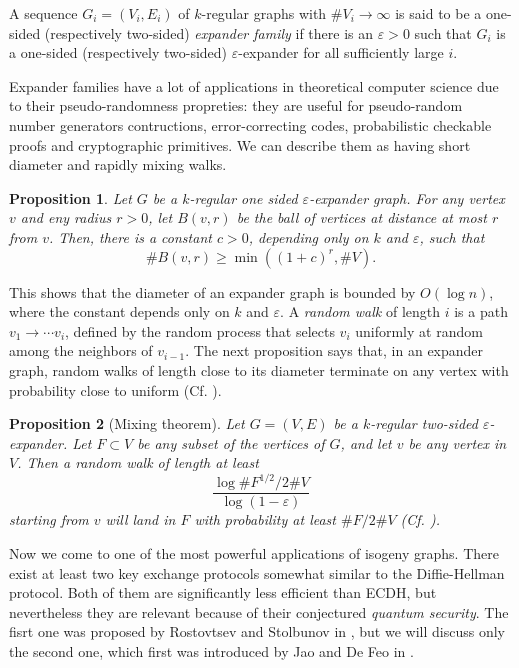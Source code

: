 \documentclass{article}
\theoremstyle{theorem}
\newtheorem{proposition}{Proposition}
\theoremstyle{definition}
\begin{document}
A sequence $G_i = (V_i, E_i)$ of $k$-regular graphs with $\#V_i \to \infty$ is said to be a one-sided (respectively two-sided) \textit{expander family} if there is an $\varepsilon > 0$ such that $G_i$ is a one-sided (respectively two-sided) $\varepsilon$-expander for all sufficiently large $i$.

Expander families have a lot of applications in theoretical computer science due to their pseudo-randomness propreties: they are useful for pseudo-random number generators contructions, error-correcting codes, probabilistic checkable proofs and cryptographic primitives. We can describe them as having short diameter and rapidly mixing walks.

\begin{proposition}
	Let $G$ be a $k$-regular one sided $\varepsilon$-expander graph. For any vertex $v$ and eny radius $r > 0$, let $B(v, r)$ be the ball of vertices at distance at most $r$ from $v$. Then, there is a constant $c > 0$, depending  only on $k$ and $\varepsilon$, such that
		\[ \#B(v, r) \geq\min((1 + c)^r, \#V). \]
\end{proposition}

This shows that the diameter of an expander graph is bounded by $O(\log n)$, where the constant depends only on $k$ and $\varepsilon$. A \textit{random walk} of length $i$ is a path $v_1 \to \cdots v_i$, defined by the random process that selects $v_i$ uniformly at random among the neighbors of $v_{i-1}$. The next proposition says that, in an expander graph, random walks of length close to its diameter terminate on any vertex with probability close to uniform (Cf. \cite{IsogenyCryptoDeFeo}).

\begin{proposition}[Mixing theorem]
	Let $G = (V, E)$ be a $k$-regular two-sided $\varepsilon$-expander. Let $F \subset V$ be any subset of the vertices of $G$, and let $v$ be any vertex in $V$. Then a random walk of length at least
		\[ \frac{\log\#F^{1/2}/2\#V}{\log(1 - \varepsilon)} \]
	starting from $v$ will land in $F$ with probability at least $\#F/2\#V$ (Cf. \cite{JaoMillerVenkatesan}).
\end{proposition}

Now we come to one of the most powerful applications of isogeny graphs. There exist at least two key exchange protocols somewhat similar to the Diffie-Hellman protocol. Both of them are significantly less efficient than ECDH, but nevertheless they are relevant because of their conjectured \textit{quantum security}. %
The fisrt one was proposed by Rostovtsev and Stolbunov in  \cite{RostovstsevStolbunov}, but we will discuss only the second one, which first was introduced by Jao and De Feo in \cite{TowardsQuantumRes}.
\end{document}
